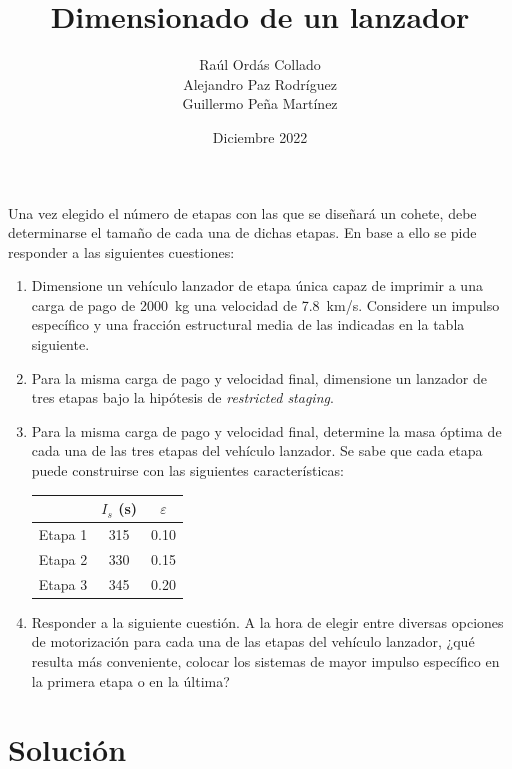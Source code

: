 \documentclass{article}
\title{Dimensionado de un lanzador}
\author{Raúl Ordás Collado \\ Alejandro Paz Rodríguez  \\ Guillermo Peña Martínez}
\date{Diciembre 2022}
\begin{document}
\pagestyle{fancy}
\fancyhf{}

\maketitle

Una vez elegido el número de etapas con las que se diseñará un cohete, debe determinarse el tamaño de cada una de dichas etapas. En base a ello se pide responder a las siguientes cuestiones:

\begin{enumerate}
    \item Dimensione un vehículo lanzador de etapa única capaz de imprimir a una carga de pago de \qty{2000}{kg} una velocidad de \qty{7.8}{km/s}. Considere un impulso específico y una fracción estructural media de las indicadas en la tabla siguiente.
    \item Para la misma carga de pago y velocidad final, dimensione un lanzador de tres etapas bajo la hipótesis de \textit{restricted staging}.
    \item Para la misma carga de pago y velocidad final, determine la masa óptima de cada una de las tres etapas del vehículo lanzador. Se sabe que cada etapa puede construirse con las siguientes características:
        \begin{table}[h]
        \centering
        \begin{tabular}{ccc}
        \hline
                & $I_s$ (s) & $\varepsilon$ \\ \hline
        Etapa 1 & 315     & 0.10     \\
        Etapa 2 & 330     & 0.15     \\
        Etapa 3 & 345     & 0.20     \\ \hline
        \end{tabular}
        \end{table}   
    \item Responder a la siguiente cuestión. A la hora de elegir entre diversas opciones de motorización para cada una de las etapas del vehículo lanzador, ¿qué resulta más conveniente, colocar los sistemas de mayor impulso específico en la primera etapa o en la última?
\end{enumerate}

\section{Solución}
\end{document}

